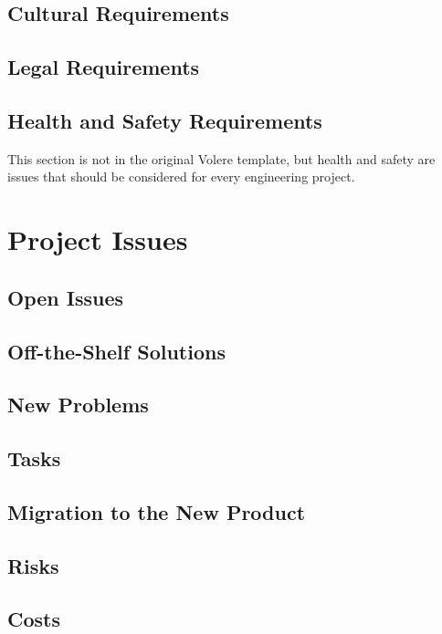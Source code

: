 \documentclass[12pt, titlepage]{article}
\begin{document}
\subsection{Cultural Requirements}

\subsection{Legal Requirements}

\subsection{Health and Safety Requirements}

This section is not in the original Volere template, but health and safety are
issues that should be considered for every engineering project.

\section{Project Issues}

\subsection{Open Issues}

\subsection{Off-the-Shelf Solutions}

\subsection{New Problems}

\subsection{Tasks}

\subsection{Migration to the New Product}

\subsection{Risks}

\subsection{Costs}
\end{document}
